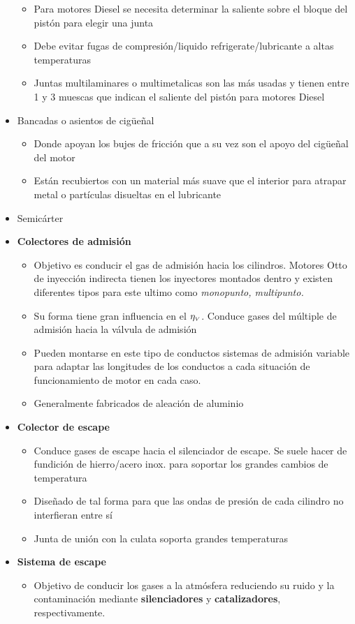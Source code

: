 \begin{itemize}
\begin{itemize}
\item Para motores Diesel se necesita determinar la saliente sobre el bloque del pistón para elegir una junta
\item Debe evitar fugas de compresión/liquido refrigerate/lubricante a altas temperaturas
\item Juntas multilaminares o multimetalicas son las más usadas y tienen entre 1 y 3 muescas que indican el saliente del pistón para motores Diesel
\end{itemize}
\item Bancadas o asientos de cigüeñal
\begin{itemize}
\item Donde apoyan los bujes de fricción que a su vez son el apoyo del cigüeñal del motor
\item Están recubiertos con un material más suave que el interior para atrapar metal o partículas disueltas en el lubricante
\end{itemize}
\item Semicárter
\item \textbf{Colectores de admisión}
\begin{itemize}
\item Objetivo es conducir el gas de admisión hacia los cilindros. Motores Otto de inyección indirecta tienen los inyectores montados dentro y existen diferentes tipos para este ultimo como \textit{monopunto, multipunto.}
\item Su forma tiene gran influencia en el $\eta_{{\mbox{\tiny$V$}}}$.  Conduce gases del múltiple de admisión hacia la válvula de admisión
\item Pueden montarse en este tipo de conductos sistemas de admisión variable para adaptar las longitudes de los conductos a cada situación de funcionamiento de motor en cada caso.
\item Generalmente fabricados de aleación de aluminio
\end{itemize}
\item \textbf{Colector de escape}
\begin{itemize}
\item Conduce gases de escape hacia el silenciador de escape. Se suele hacer de fundición de hierro/acero inox. para soportar los grandes cambios de temperatura
\item Diseñado de tal forma para que las ondas de presión de cada cilindro no interfieran entre sí
\item Junta de unión con la culata soporta grandes temperaturas
\end{itemize}
\item \textbf{Sistema de escape}
\begin{itemize}
    \item Objetivo de conducir los gases a la atmósfera reduciendo su ruido y la contaminación mediante \textbf{silenciadores} y \textbf{catalizadores}, respectivamente.
\end{itemize}
\end{itemize}

